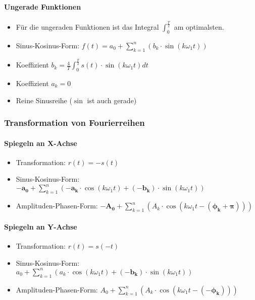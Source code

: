 \paragraph{Ungerade Funktionen}
\begin{itemize}
  \item Für die ungeraden Funktionen ist das Integral
    $\int_0^{\frac{T}{2}}$ am optimalsten.
  \item Sinus-Kosinus-Form: $f(t) = a_0 + \sum_{k=1}^{n}
    (b_k \cdot \sin(k \omega_1 t))$
  \item Koeffizient $b_k = \frac{4}{T} \int_0^{\frac{T}{2}} s(t) \cdot \sin(k \omega_1 t) dt$
  \item Koeffizient $a_k = 0$
  \item Reine Sinusreihe ($\sin$ ist auch gerade)
\end{itemize}

\subsubsection{Transformation von Fourierreihen}
\paragraph{Spiegeln an X-Achse}
\begin{itemize}
  \item Transformation: $r(t) = -s(t)$
  \item Sinus-Kosinus-Form: $\boldsymbol{-a_0} + \sum_{k=1}^{n}
    (\boldsymbol{-a_k} \cdot \cos(k \omega_1 t) +
    \boldsymbol{(-b_k)} \cdot \sin(k \omega_1 t))$
  \item Amplituden-Phasen-Form: $\boldsymbol{-A_0} + \sum_{k=1}^{n}
    (A_k \cdot \cos(k \omega_1 t  - \boldsymbol{(\phi_k + \pi)}))$
\end{itemize}
\paragraph{Spiegeln an Y-Achse}
\begin{itemize}
  \item Transformation: $r(t) = s(-t)$
  \item Sinus-Kosinus-Form: $a_0 + \sum_{k=1}^{n} ( a_k \cdot
    \cos(k \omega_1 t) + \boldsymbol{(-b_k)} \cdot \sin(k \omega_1 t))$
  \item Amplituden-Phasen-Form: $A_0 + \sum_{k=1}^{n}
    (A_k \cdot \cos(k \omega_1 t  - \boldsymbol{(-\phi_k)}))$
\end{itemize}
